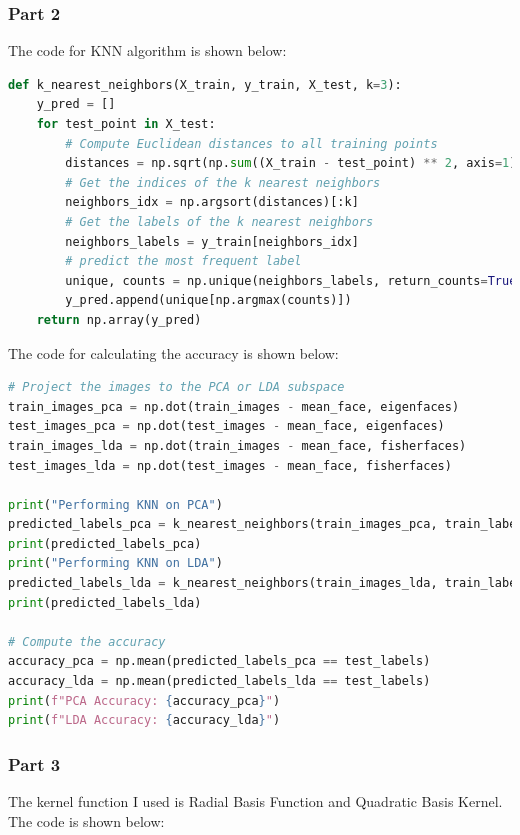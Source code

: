 \documentclass{homework}
\begin{document}
\subsubsection{Part 2}

The code for KNN algorithm is shown below:

\begin{lstlisting}[language=Python]
def k_nearest_neighbors(X_train, y_train, X_test, k=3):
    y_pred = []
    for test_point in X_test:
        # Compute Euclidean distances to all training points
        distances = np.sqrt(np.sum((X_train - test_point) ** 2, axis=1))
        # Get the indices of the k nearest neighbors
        neighbors_idx = np.argsort(distances)[:k]
        # Get the labels of the k nearest neighbors
        neighbors_labels = y_train[neighbors_idx]
        # predict the most frequent label
        unique, counts = np.unique(neighbors_labels, return_counts=True)
        y_pred.append(unique[np.argmax(counts)])
    return np.array(y_pred)
\end{lstlisting}

The code for calculating the accuracy is shown below:

\begin{lstlisting}[language=Python]
# Project the images to the PCA or LDA subspace
train_images_pca = np.dot(train_images - mean_face, eigenfaces)
test_images_pca = np.dot(test_images - mean_face, eigenfaces)
train_images_lda = np.dot(train_images - mean_face, fisherfaces)
test_images_lda = np.dot(test_images - mean_face, fisherfaces)

print("Performing KNN on PCA")
predicted_labels_pca = k_nearest_neighbors(train_images_pca, train_labels, test_images_pca, k=3)
print(predicted_labels_pca)
print("Performing KNN on LDA")
predicted_labels_lda = k_nearest_neighbors(train_images_lda, train_labels, test_images_lda, k=3)
print(predicted_labels_lda)

# Compute the accuracy
accuracy_pca = np.mean(predicted_labels_pca == test_labels)
accuracy_lda = np.mean(predicted_labels_lda == test_labels)
print(f"PCA Accuracy: {accuracy_pca}")
print(f"LDA Accuracy: {accuracy_lda}")
\end{lstlisting}

\subsubsection{Part 3}

The kernel function I used is Radial Basis Function and Quadratic Basis Kernel. The code is shown below:
\end{document}
